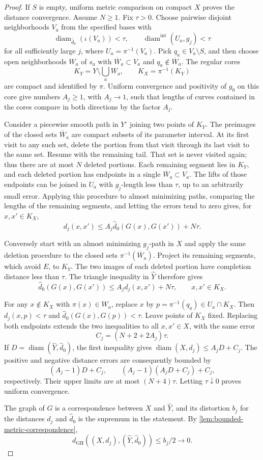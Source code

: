 \begin{proof}
If $S$ is empty, uniform metric comparison on compact $X$ proves the distance convergence. Assume $N\geq1$. Fix $\tau>0$. Choose pairwise disjoint neighborhoods $V_a$ from the specified bases with
\[
 \operatorname{diam}_{\widehat d_0}(\iota(V_a))<\tau,
 \qquad \operatorname{diam}^{\mathrm{int}}(U_a,g_j)<\tau
\]
for all sufficiently large $j$, where $U_a=\pi^{-1}(V_a)$. Pick $q_a\in V_a\setminus S$, and then choose open neighborhoods $W_a$ of $s_a$ with $\overline W_a\subset V_a$ and $q_a\notin\overline W_a$. The regular cores
\[
 K_Y=Y\setminus\bigcup_a W_a,
 \qquad K_X=\pi^{-1}(K_Y)
\]
are compact and identified by $\pi$. Uniform convergence and positivity of $g_0$ on this core give numbers $A_j\geq1$, with $A_j\to1$, such that lengths of curves contained in the cores compare in both directions by the factor $A_j$.

Consider a piecewise smooth path in $Y^\circ$ joining two points of $K_Y$. The preimages of the closed sets $\overline W_a$ are compact subsets of its parameter interval. At its first visit to any such set, delete the portion from that visit through its last visit to the same set. Resume with the remaining tail. That set is never visited again; thus there are at most $N$ deleted portions. Each remaining segment lies in $K_Y$, and each deleted portion has endpoints in a single $\overline W_a\subset V_a$. The lifts of those endpoints can be joined in $U_a$ with $g_j$-length less than $\tau$, up to an arbitrarily small error. Applying this procedure to almost minimizing paths, comparing the lengths of the remaining segments, and letting the errors tend to zero gives, for $x,x'\in K_X$,
\[
 d_j(x,x')\leq A_j\widehat d_0(G(x),G(x'))+N\tau.
\]

Conversely start with an almost minimizing $g_j$-path in $X$ and apply the same deletion procedure to the closed sets $\pi^{-1}(\overline W_a)$. Project its remaining segments, which avoid $E$, to $K_Y$. The two images of each deleted portion have completion distance less than $\tau$. The triangle inequality in $\widehat Y$ therefore gives
\[
 \widehat d_0(G(x),G(x'))\leq A_j d_j(x,x')+N\tau,
 \qquad x,x'\in K_X.
\]

For any $x\notin K_X$ with $\pi(x)\in W_a$, replace $x$ by $p=\pi^{-1}(q_a)\in U_a\cap K_X$. Then $d_j(x,p)<\tau$ and $\widehat d_0(G(x),G(p))<\tau$. Leave points of $K_X$ fixed. Replacing both endpoints extends the two inequalities to all $x,x'\in X$, with the same error
\[
 C_j=(N+2+2A_j)\tau.
\]
If $D=\operatorname{diam}(\widehat Y,\widehat d_0)$, the first inequality gives $\operatorname{diam}(X,d_j)\leq A_jD+C_j$. The positive and negative distance errors are consequently bounded by
\[
 (A_j-1)D+C_j,
 \qquad (A_j-1)(A_jD+C_j)+C_j,
\]
respectively. Their upper limits are at most $(N+4)\tau$. Letting $\tau\downarrow0$ proves uniform convergence.

The graph of $G$ is a correspondence between $X$ and $\widehat Y$, and its distortion $b_j$ for the distances $d_j$ and $\widehat d_0$ is the supremum in the statement. By \cref{lem:bounded-metric-correspondence},
\[
 d_{\mathrm{GH}}((X,d_j),(\widehat Y,\widehat d_0))\leq b_j/2\longrightarrow0.
\]
\end{proof}


